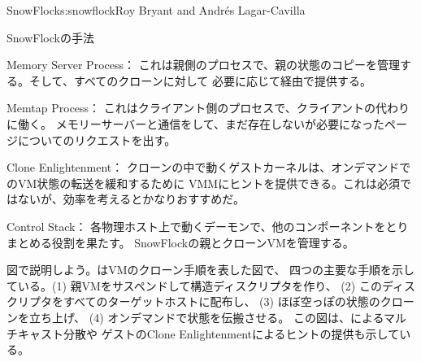 \begin{aosachapter}{SnowFlock}{s:snowflock}{Roy Bryant and Andr\'e{s} Lagar-Cavilla}
\begin{aosasect1}{SnowFlockの手法}
\begin{aosaitemize}
  \item Memory Server Process：
  これは親側のプロセスで、親の状態のコピーを管理する。そして、すべてのクローンに対して
  必要に応じて経由で提供する。

  \item Memtap Process：
  これはクライアント側のプロセスで、クライアントの代わりに働く。
  メモリーサーバーと通信をして、まだ存在しないが必要になったページについてのリクエストを出す。

  \item Clone Enlightenment：
  クローンの中で動くゲストカーネルは、オンデマンドでのVM状態の転送を緩和するために
  VMMにヒントを提供できる。これは必須ではないが、効率を考えるとかなりおすすめだ。

  \item Control Stack：
  各物理ホスト上で動くデーモンで、他のコンポーネントをとりまとめる役割を果たす。
  SnowFlockの親とクローンVMを管理する。

\end{aosaitemize}


図で説明しよう。はVMのクローン手順を表した図で、
四つの主要な手順を示している。(1) 親VMをサスペンドして構造ディスクリプタを作り、
(2) このディスクリプタをすべてのターゲットホストに配布し、
(3) ほぼ空っぽの状態のクローンを立ち上げ、
(4) オンデマンドで状態を伝搬させる。
この図は、によるマルチキャスト分散や
ゲストのClone Enlightenmentによるヒントの提供も示している。


\end{aosasect1}
\end{aosachapter}
